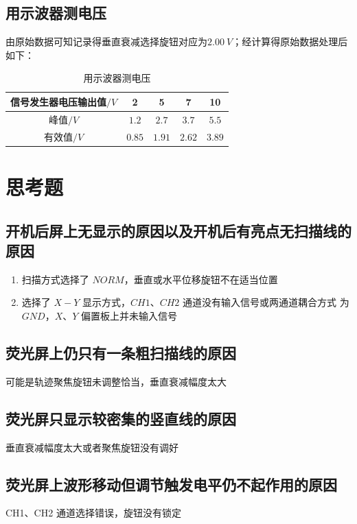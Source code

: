 \documentclass[UTF8]{ctexart}
\begin{document}
\subsection{用示波器测电压}
由原始数据可知记录得垂直衰减选择旋钮对应为$2.00 \ V$；经计算得原始数据处理后如下：

\begin{table}[H]
    \centering
    \caption{用示波器测电压}
    \begin{tabular}{|c|c|c|c|c|}
    \hline
        信号发生器电压输出值$/V$ & 2 & 5  & 7 & 10   \\
    \hline
        峰值$/V$ & $1.2$ & $2.7$ & $3.7$ & $5.5$ \\
    \hline
        有效值$/V$ & $0.85$ & $1.91$ & $2.62$ & $3.89$ \\
    \hline
    \end{tabular}
\end{table}

\section{思考题}
\subsection{开机后屏上无显示的原因以及开机后有亮点无扫描线的原因}
\begin{enumerate}
    \item 扫描方式选择了 $NORM$，垂直或水平位移旋钮不在适当位置
    \item 选择了 $X-Y$ 显示方式，$CH1$、$CH2$ 通道没有输入信号或两通道耦合方式
为 $GND$，$X$、$Y$ 偏置板上并未输入信号
\end{enumerate}
\subsection{荧光屏上仍只有一条粗扫描线的原因}
可能是轨迹聚焦旋钮未调整恰当，垂直衰减幅度太大

\subsection{荧光屏只显示较密集的竖直线的原因}
垂直衰减幅度太大或者聚焦旋钮没有调好

\subsection{荧光屏上波形移动但调节触发电平仍不起作用的原因}
CH1、CH2 通道选择错误，旋钮没有锁定
\end{document}
